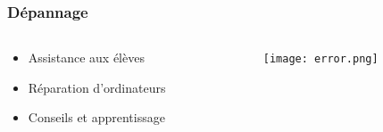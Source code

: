 \documentclass[14pt]{beamer}
\begin{document}
\begin{frame}
    \frametitle{Dépannage}
    \begin{columns}
        \begin{column}{.6\textwidth}
            \begin{itemize}
                \item Assistance aux élèves
                \item Réparation d'ordinateurs
                \item Conseils et apprentissage
            \end{itemize}
        \end{column}
        \begin{column}{.4\textwidth}
        \texttt{[image: error.png]}
        \end{column}
    \end{columns}
\end{frame}

\end{document}
